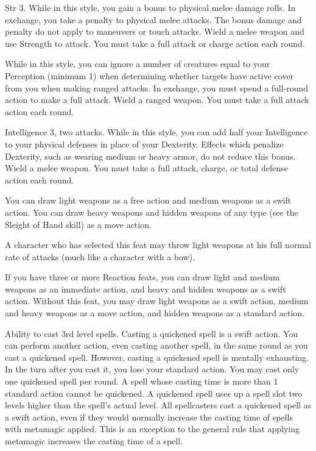 \featpres Str 3.
\featben While in this style, you gain a  bonus to physical melee damage rolls.
In exchange, you take a  penalty to physical melee attacks.
The bonus damage and penalty do not apply to maneuvers or touch attacks.
\stylereq Wield a melee weapon and use Strength to attack.
You must take a full attack or charge action each round.

\featben While in this style, you can ignore a number of creatures equal to your Perception (minimum 1) when determining whether targets have active cover from you when making ranged attacks.
In exchange, you must spend a full-round action to make a full attack.
\stylereq Wield a ranged weapon.
You must take a full attack action each round.

\featpre Intelligence 3, two attacks.
\featben While in this style, you can add half your Intelligence to your physical defenses in place of your Dexterity.
Effects which penalize Dexterity, such as wearing medium or heavy armor, do not reduce this bonus.
\stylereq Wield a melee weapon.
You must take a full attack, charge, or total defense action each round.

\featben You can draw light weapons as a free action and medium weapons as a swift action.
You can draw heavy weapons and hidden weapons of any type (see the Sleight of Hand skill) as a move action.
\par A character who has selected this feat may throw light weapons at his full normal rate of attacks (much like a character with a bow).

If you have three or more Reaction feats, you can draw light and medium weapons as an immediate action, and heavy and hidden weapons as a swift action.
Without this feat, you may draw light weapons as a swift action, medium and heavy weapons as a move action, and hidden weapons as a standard action.

\label{Quicken Spell}
\featpre Ability to cast 3rd level spells.
\featben Casting a quickened spell is a swift action.
You can perform another action, even casting another spell, in the same round as you cast a quickened spell.
However, casting a quickened spell is mentally exhausting.
In the turn after you cast it, you lose your standard action.
You may cast only one quickened spell per round.
A spell whose casting time is more than 1 standard action cannot be quickened.
A quickened spell uses up a spell slot two levels higher than the spell's actual level.
All spellcasters cast a quickened spell as a swift action, even if they would normally increase the casting time of spells with metamagic applied.
This is an exception to the general rule that applying metamagic increases the casting time of a spell.

